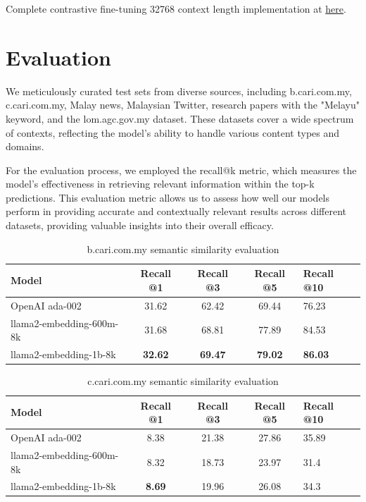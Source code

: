 \documentclass[preprint]{article}
\begin{document}
Complete contrastive fine-tuning 32768 context length implementation at \href{https://github.com/mesolitica/llm-embedding/blob/main/run-2b-contrastive.sh}{here}.

\section{Evaluation}

We meticulously curated test sets from diverse sources, including b.cari.com.my, c.cari.com.my, Malay news, Malaysian Twitter, research papers with the "Melayu" keyword, and the lom.agc.gov.my dataset. These datasets cover a wide spectrum of contexts, reflecting the model's ability to handle various content types and domains.

For the evaluation process, we employed the recall@k metric, which measures the model's effectiveness in retrieving relevant information within the top-k predictions. This evaluation metric allows us to assess how well our models perform in providing accurate and contextually relevant results across different datasets, providing valuable insights into their overall efficacy.

\begin{table}[hbt!]
  \centering
  \begin{tabular}{lcccl}
    \hline
    \textbf{Model}           & \textbf{Recall @1} & \textbf{Recall @3} & \textbf{Recall @5} & \textbf{Recall @10} \\
    \hline
    OpenAI ada-002           & 31.62              & 62.42              & 69.44              & 76.23               \\
    llama2-embedding-600m-8k & 31.68              & 68.81              & 77.89              & 84.53               \\
    llama2-embedding-1b-8k   & \textbf{32.62}     & \textbf{69.47}     & \textbf{79.02}     & \textbf{86.03}      \\
    \hline
  \end{tabular}
  \caption{b.cari.com.my semantic similarity evaluation}
\end{table}

\begin{table}[hbt!]
  \centering
  \begin{tabular}{lcccl}
    \hline
    \textbf{Model}           & \textbf{Recall @1} & \textbf{Recall @3} & \textbf{Recall @5} & \textbf{Recall @10} \\
    \hline
    OpenAI ada-002           & 8.38               & 21.38              & 27.86              & 35.89               \\
    llama2-embedding-600m-8k & 8.32               & 18.73              & 23.97              & 31.4                \\
    llama2-embedding-1b-8k   & \textbf{8.69}      & 19.96              & 26.08              & 34.3                \\
    \hline
  \end{tabular}
  \caption{c.cari.com.my semantic similarity evaluation}
\end{table}
\end{document}
